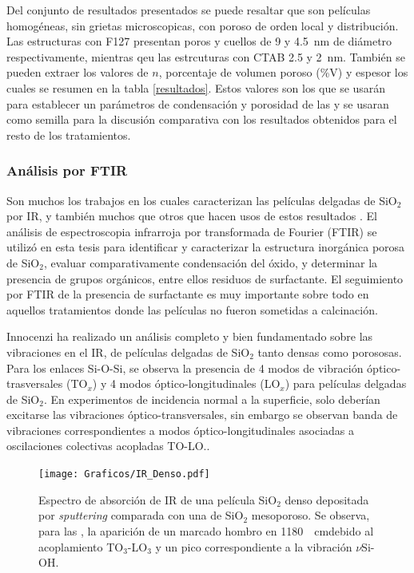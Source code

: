 		 	Del conjunto de resultados presentados se puede resaltar que son películas homogéneas, sin grietas microscopicas, con poroso de orden local y distribución. Las \pdm\space estructuras con F127 presentan poros	y cuellos de 9 y \SI{4.5}{\nm} de diámetro respectivamente, mientras qeu las estrcuturas con CTAB 2.5 y \SI{2}{\nm}. También se pueden extraer los valores de $n$, porcentaje de volumen poroso (\%V) y espesor los cuales se resumen en la tabla \ref{resultados}. Estos valores son los que se usarán para establecer un parámetros de condensación y porosidad de las \pdm y se usaran como semilla para la discusión comparativa con los resultados obtenidos para el resto de los tratamientos.

	    \subsubsection{Análisis por FTIR}\label{sec:Analisis_IR}

		 Son muchos los trabajos en los cuales caracterizan las películas delgadas de SiO$_2$ por IR\cite{Olsen1989,Almeida1990,Redol1997,Innocenzi2003}, y también muchos que otros que hacen usos de estos resultados \cite{Angelome2008,Calvo2008,Calvo20210}.
		 El análisis de espectroscopia infrarroja por transformada de Fourier (FTIR) se utilizó en esta tesis para identificar y caracterizar la estructura inorgánica porosa de SiO$_2$, evaluar comparativamente condensación del óxido, y determinar la presencia de grupos orgánicos, entre ellos residuos de surfactante. El seguimiento por FTIR de la presencia de surfactante es muy importante sobre todo en aquellos tratamientos donde las películas no fueron sometidas a calcinación.

		 Innocenzi\cite{Innocenzi2003} ha realizado un análisis completo y bien fundamentado sobre las vibraciones en el IR, de películas delgadas de SiO$_2$ tanto densas como porososas. Para los enlaces Si-O-Si, se observa la presencia de 4 modos de vibración óptico-trasversales (TO$_x$) y 4 modos óptico-longitudinales (LO$_x$) para películas delgadas de SiO$_2$. En experimentos de incidencia normal a la superficie, solo deberían excitarse las vibraciones óptico-transversales, sin embargo se observan banda de vibraciones correspondientes a modos óptico-longitudinales asociadas a oscilaciones colectivas acopladas TO-LO.\cite{Pai1986,Grosse1986,Innocenzi2003}.

		 	 \begin{figure}[!ht]
						\begin{center}
						\texttt{[image: Graficos/IR\_Denso.pdf]}
						\caption[FTIR SiO$_2$ denso y SiO$_2$ mesoporoso.]{Espectro de absorción de IR de una película SiO$_2$ denso depositada por \textit{sputtering} comparada con una de SiO$_2$ mesoporoso. Se observa, para las \pdm, la aparición de un marcado hombro en \SI{1180}{\per\cm}debido al acoplamiento TO$_3$-LO$_3$ y un pico correspondiente a la vibración $\nu$Si-OH.}
						\label{fig:IR-denso}
						\end{center}
						\end{figure}

